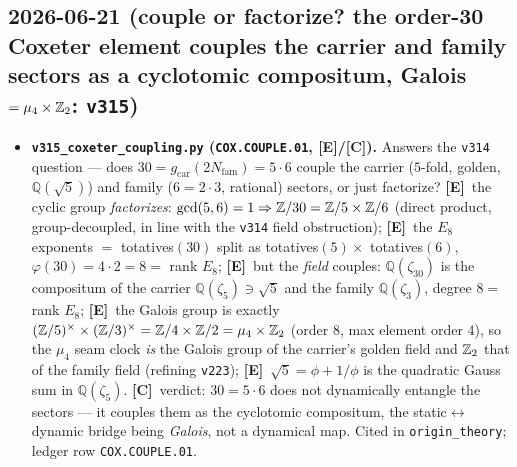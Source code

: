\documentclass[11pt]{article}
\providecommand{\mE}{\textbf{[E]}}\providecommand{\mC}{\textbf{[C]}}
\providecommand{\gcar}{g_{\mathrm{car}}}\providecommand{\Nfam}{N_{\mathrm{fam}}}
\begin{document}
\subsection*{2026-06-21 (couple or factorize? the order-30 Coxeter element couples the carrier and family sectors as a cyclotomic compositum, Galois $=\mu_4\times\mathbb{Z}_2$: \texttt{v315})}
\begin{itemize}
\item \textbf{\texttt{v315\_coxeter\_coupling.py} (\texttt{COX.COUPLE.01}, \mE/\mC).} Answers the \texttt{v314}
  question --- does $30=\gcar(2\Nfam)=5\cdot6$ couple the carrier ($5$-fold, golden, $\mathbb Q(\sqrt5)$) and family
  ($6=2\cdot3$, rational) sectors, or just factorize? \mE\ the cyclic group \emph{factorizes}: $\gcd(5,6)=1\Rightarrow
  \mathbb{Z}/30=\mathbb{Z}/5\times\mathbb{Z}/6$ (direct product, group-decoupled, in line with the \texttt{v314} field obstruction); \mE\ the
  $E_8$ exponents $=$ totatives$(30)$ split as totatives$(5)\times$ totatives$(6)$, $\varphi(30)=4\cdot2=8=$ rank
  $E_8$; \mE\ but the \emph{field} couples: $\mathbb Q(\zeta_{30})$ is the compositum of the carrier
  $\mathbb Q(\zeta_5)\ni\sqrt5$ and the family $\mathbb Q(\zeta_3)$, degree $8=$ rank $E_8$; \mE\ the Galois group is
  exactly $(\mathbb{Z}/5)^\times\times(\mathbb{Z}/3)^\times=\mathbb{Z}/4\times\mathbb{Z}/2=\mu_4\times\mathbb{Z}_2$ (order $8$, max element order $4$), so the
  $\mu_4$ seam clock \emph{is} the Galois group of the carrier's golden field and $\mathbb{Z}_2$ that of the family field
  (refining \texttt{v223}); \mE\ $\sqrt5=\phi+1/\phi$ is the quadratic Gauss sum in $\mathbb Q(\zeta_5)$. \mC\ verdict:
  $30=5\cdot6$ does not dynamically entangle the sectors --- it couples them as the cyclotomic compositum, the
  static$\leftrightarrow$dynamic bridge being \emph{Galois}, not a dynamical map. Cited in \texttt{origin\_theory};
  ledger row \texttt{COX.COUPLE.01}.
\end{itemize}
\end{document}
